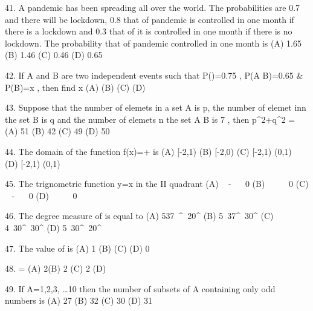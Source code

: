 41. A pandemic has been spreading all over the world. The probabilities are 0.7 and there will be lockdown, 0.8 that of pandemic is controlled in one month if there is a lockdown and 0.3 that of it is controlled in one month if there is no lockdown. The probability that of pandemic controlled in one month is
(A) 1.65 \qquad \qquad \qquad \qquad \qquad (B) 1.46
(C) 0.46 \qquad \qquad \qquad \qquad \qquad (D) 0.65

42. If A and B are two independent events such that P()=0.75 , P(A \cup B)=0.65 & P(B)=x , then find x
(A)  \qquad \qquad \qquad \qquad \qquad (B) 
(C)  \qquad \qquad \qquad \qquad \qquad (D) 

43. Suppose that the number of elemets in a set A is p, the number of elemet inn the set B is q and the number of elemets n the set A \times B is 7 , then p^2+q^2 = \underline{\qquad \qquad}
(A) 51 \qquad \qquad \qquad \qquad \qquad (B) 42
(C) 49 \qquad \qquad \qquad \qquad \qquad (D) 50

44. The domain of the function f(x)=+ is
(A) [-2,1) \qquad \qquad \qquad \qquad \qquad (B) [-2,0)
(C) [-2,1) \cup (0,1) \qquad \qquad \qquad ~~ (D) [-2,1) \cap (0,1)

45. The trignometric function y=\tan x in the II quadrant
(A)  ~ -\infty ~  ~ 0 \qquad \qquad \qquad \qquad \qquad (B)  ~ \infty ~  ~ 0
(C)  ~ -\infty ~  ~ 0 \qquad \qquad \qquad \qquad \qquad (D)  ~ \infty ~  ~ 0

46. The degree measure of  is equal to
(A) 5\mathring{}37~^{\prime}~20^{\prime \prime} \qquad \qquad \qquad \qquad \qquad (B) 5\mathring{}~37^{\prime}~30^{\prime \prime}
(C) 4\mathring{}~30^{\prime}~30^{\prime \prime} \qquad \qquad \qquad \qquad \qquad (D) 5\mathring{}~30^{\prime}~20^{\prime \prime}

47. The value of \sin {}\sin {} is
(A) 1 \qquad \qquad \qquad \qquad \qquad (B) 
(C)  \qquad \qquad \qquad \qquad \qquad (D) 0

48. =
(A) 2\cos \theta \qquad \qquad \qquad \qquad \qquad (B) 2\sin \theta
(C) 2\cos {} \qquad \qquad \qquad \qquad \qquad (D) \theta

49. If A={1,2,3, \dots 10} then the number of subsets of A containing only odd numbers is
(A) 27 \qquad \qquad \qquad \qquad \qquad (B) 32
(C) 30 \qquad \qquad \qquad \qquad \qquad (D) 31

